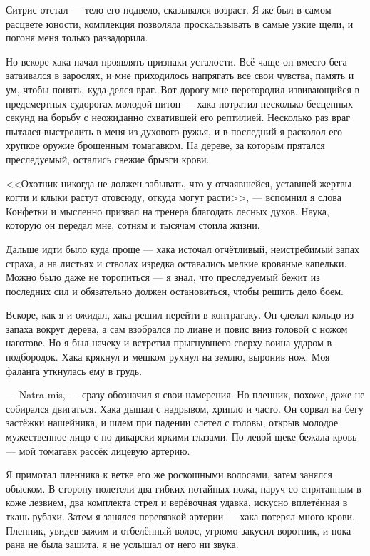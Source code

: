 Ситрис отстал --- тело его подвело, сказывался возраст.
Я же был в самом расцвете юности, комплекция позволяла проскальзывать в самые узкие щели, и погоня меня только раззадорила.

Но вскоре хака начал проявлять признаки усталости.
Всё чаще он вместо бега затаивался в зарослях, и мне приходилось напрягать все свои чувства, память и ум, чтобы понять, куда делся враг.
Вот дорогу мне перегородил извивающийся в предсмертных судорогах молодой питон --- хака потратил несколько бесценных секунд на борьбу с неожиданно схватившей его рептилией.
Несколько раз враг пытался выстрелить в меня из духового ружья, и в последний я расколол его хрупкое оружие брошенным томагавком.
На дереве, за которым прятался преследуемый, остались свежие брызги крови.

<<Охотник никогда не должен забывать, что у отчаявшейся, уставшей жертвы когти и клыки растут отовсюду, откуда могут расти>>, --- вспомнил я слова Конфетки и мысленно призвал на тренера благодать лесных духов.
Наука, которую он передал мне, сотням и тысячам стоила жизни.

Дальше идти было куда проще --- хака источал отчётливый, неистребимый запах страха, а на листьях и стволах изредка оставались мелкие кровяные капельки.
Можно было даже не торопиться --- я знал, что преследуемый бежит из последних сил и обязательно должен остановиться, чтобы решить дело боем.

Вскоре, как я и ожидал, хака решил перейти в контратаку.
Он сделал кольцо из запаха вокруг дерева, а сам взобрался по лиане и повис вниз головой с ножом наготове.
Но я был начеку и встретил прыгнувшего сверху воина ударом в подбородок.
Хака крякнул и мешком рухнул на землю, выронив нож.
Моя фаланга уткнулась ему в грудь.

--- Natra mis\FM, --- сразу обозначил я свои намерения.
Но пленник, похоже, даже не собирался двигаться.
Хака дышал с надрывом, хрипло и часто. Он сорвал на бегу застёжки нашейника, и шлем при падении слетел с головы, открыв молодое мужественное лицо с по-дикарски яркими глазами.
По левой щеке бежала кровь --- мой томагавк рассёк лицевую артерию.

Я примотал пленника к ветке его же роскошными волосами, затем занялся обыском.
В сторону полетели два гибких потайных ножа, наруч со спрятанным в коже лезвием, два комплекта стрел и верёвочная удавка, искусно вплетённая в ткань рубахи.
Затем я занялся перевязкой артерии --- хака потерял много крови.
Пленник, увидев зажим и отбелённый волос, угрюмо закусил воротник, и пока рана не была зашита, я не услышал от него ни звука.


